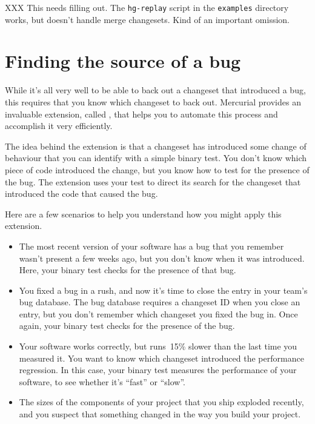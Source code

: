 XXX This needs filling out.  The \texttt{hg-replay} script in the
\texttt{examples} directory works, but doesn't handle merge
changesets.  Kind of an important omission.

\section{Finding the source of a bug}
\label{sec:undo:bisect}

While it's all very well to be able to back out a changeset that
introduced a bug, this requires that you know which changeset to back
out.  Mercurial provides an invaluable extension, called
, that helps you to automate this process and accomplish
it very efficiently.

The idea behind the  extension is that a changeset has
introduced some change of behaviour that you can identify with a
simple binary test.  You don't know which piece of code introduced the
change, but you know how to test for the presence of the bug.  The
 extension uses your test to direct its search for the
changeset that introduced the code that caused the bug.

Here are a few scenarios to help you understand how you might apply this
extension.
\begin{itemize}
\item The most recent version of your software has a bug that you
  remember wasn't present a few weeks ago, but you don't know when it
  was introduced.  Here, your binary test checks for the presence of
  that bug.
\item You fixed a bug in a rush, and now it's time to close the entry
  in your team's bug database.  The bug database requires a changeset
  ID when you close an entry, but you don't remember which changeset
  you fixed the bug in.  Once again, your binary test checks for the
  presence of the bug.
\item Your software works correctly, but runs~15\% slower than the
  last time you measured it.  You want to know which changeset
  introduced the performance regression.  In this case, your binary
  test measures the performance of your software, to see whether it's
  ``fast'' or ``slow''.
\item The sizes of the components of your project that you ship
  exploded recently, and you suspect that something changed in the way
  you build your project.
\end{itemize}

